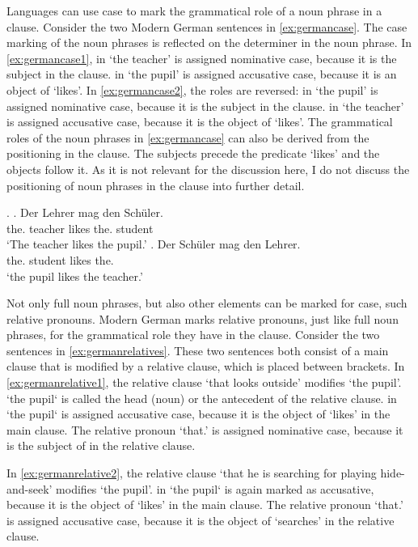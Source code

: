 Languages can use case to mark the grammatical role of a noun phrase in a clause. Consider the two Modern German sentences in \ref{ex:germancase}. The case marking of the noun phrases is reflected on the determiner in the noun phrase.
In \ref{ex:germancase1},  in  `the teacher' is assigned nominative case, because it is the subject in the clause.  in  `the pupil' is assigned accusative case, because it is an object of  `likes'.
In \ref{ex:germancase2}, the roles are reversed:  in  `the pupil' is assigned nominative case, because it is the subject in the clause.  in  `the teacher' is assigned accusative case, because it is the object of  `likes'.
The grammatical roles of the noun phrases in \ref{ex:germancase} can also be derived from the positioning in the clause. The subjects precede the predicate  `likes' and the objects follow it. As it is not relevant for the discussion here, I do not discuss the positioning of noun phrases in the clause into further detail.

\ex.\label{ex:germancase}
\ag. Der Lehrer mag den Schüler.\\
 the. teacher likes the. student\\
 `The teacher likes the pupil.'\label{ex:germancase1}
\bg. Der Schüler mag den Lehrer.\\
 the. student likes the.\\
 `the pupil likes the teacher.'\label{ex:germancase2}

Not only full noun phrases, but also other elements can be marked for case, such relative pronouns. Modern German marks relative pronouns, just like full noun phrases, for the grammatical role they have in the clause. Consider the two sentences in \ref{ex:germanrelatives}. These two sentences both consist of a main clause that is modified by a relative clause, which is placed between brackets.
In \ref{ex:germanrelative1}, the relative clause  `that looks outside' modifies  `the pupil'.  `the pupil` is called the head (noun) or the antecedent of the relative clause.  in  `the pupil` is assigned accusative case, because it is the object of  `likes' in the main clause. The relative pronoun  `that.' is assigned nominative case, because it is the subject of in the relative clause.

In \ref{ex:germanrelative2}, the relative clause  `that he is searching for playing hide-and-seek' modifies  `the pupil'.  in  `the pupil` is again marked as accusative, because it is the object of  `likes' in the main clause. The relative pronoun  `that.' is assigned accusative case, because it is the object of  `searches' in the relative clause.

